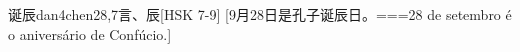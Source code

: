 \begin{EntryWithPhonetic}{诞辰}{dan4chen2}{8,7}{⾔、⾠}[HSK 7-9]
  [9月28日是孔子诞辰日。===28 de setembro é o aniversário de Confúcio.]
\end{EntryWithPhonetic}
